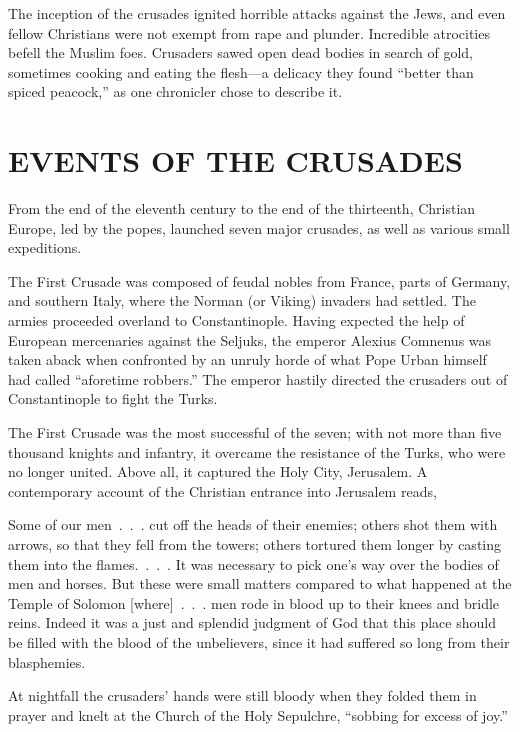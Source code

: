 The inception of the crusades ignited horrible attacks against the Jews, and even fellow Christians
were not exempt from rape and plunder. Incredible atrocities befell the Muslim foes. Crusaders sawed
open dead bodies in search of gold, sometimes cooking and eating the flesh—a delicacy they found
“better than spiced peacock,” as one chronicler chose to describe it.

\section{EVENTS OF THE CRUSADES}

From the end of the eleventh century to the end of the thirteenth, Christian Europe, led by the
popes, launched seven major crusades, as well as various small expeditions.

The First Crusade was composed of feudal nobles from France, parts of Germany, and southern Italy,
where the Norman (or Viking) invaders had settled. The armies proceeded overland to Constantinople.
Having expected the help of European mercenaries against the Seljuks, the emperor Alexius Comnenus
was taken aback when confronted by an unruly horde of what Pope Urban himself had called “aforetime
robbers.” The emperor hastily directed the crusaders out of Constantinople to fight the Turks.

The First Crusade was the most successful of the seven; with not more than five thousand knights and
infantry, it overcame the resistance of the Turks, who were no longer united. Above all, it captured
the Holy City, Jerusalem. A contemporary account of the Christian entrance into Jerusalem reads,

\begin{blockquote}
Some of our men~.~.~. cut off the heads of their enemies; others shot them with arrows, so that they
fell from the towers; others tortured them longer by casting them into the flames.~.~.~. It was
necessary to pick one’s way over the bodies of men and horses. But these were small matters compared
to what happened at the Temple of Solomon [where]~.~.~. men rode in blood up to their knees and
bridle reins. Indeed it was a just and splendid judgment of God that this place should be filled
with the blood of the unbelievers, since it had suffered so long from their blasphemies.
\end{blockquote}

\noindent At nightfall the crusaders’ hands were still bloody when they folded them in prayer and
knelt at the Church of the Holy Sepulchre, “sobbing for excess of joy.”

